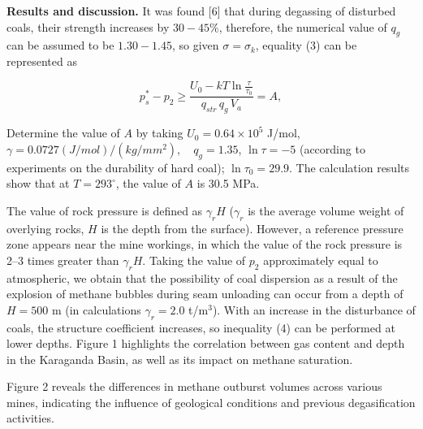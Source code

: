 \begin{multicols}{2}
{\bfseries Results and discussion.} It was found [6] that during
degassing of disturbed coals, their strength increases by $30-45\%$,
therefore, the numerical value of $q_g$ can be assumed to be
$1.30-1.45$, so given $\sigma = \sigma_k$, equality (3) can be
represented as

\begin{equation}
p_s^* - p_2 \geq \frac{U_0 - kT \ln \frac{\tau}{\tau_0}}{q_{str} \, q_{g} \, V_a} = A,
\end{equation}

Determine the value of $A$ by taking $U_0 = 0.64 \times 10^5$ J/mol,
$\gamma = 0.0727(J/mol)/(kg/mm^2),\quad q_g = 1.35$, $\ln \tau = -5$
(according to experiments on the durability of hard coal); $\ln \tau_0
= 29.9$. The calculation results show that at $T = 293^\circ$, the
value of $A$ is 30.5 MPa.

The value of rock pressure is defined as $\gamma_r H$ ($\gamma_r$ is
the average volume weight of overlying rocks, $H$ is the depth from
the surface). However, a reference pressure zone appears near the mine
workings, in which the value of the rock pressure is 2–3 times greater
than $\gamma_r H$. Taking the value of $p_2$ approximately equal to
atmospheric, we obtain that the possibility of coal dispersion as a
result of the explosion of methane bubbles during seam unloading can
occur from a depth of $H = 500$ m (in calculations $\gamma_r = 2.0$
t/m$^3$). With an increase in the disturbance of coals, the structure
coefficient increases, so inequality (4) can be performed at lower
depths. Figure 1 highlights the correlation between gas content and
depth in the Karaganda Basin, as well as its impact on methane
saturation.

Figure 2 reveals the differences in methane outburst volumes across
various mines, indicating the influence of geological conditions and
previous degasification activities.
\end{multicols}

